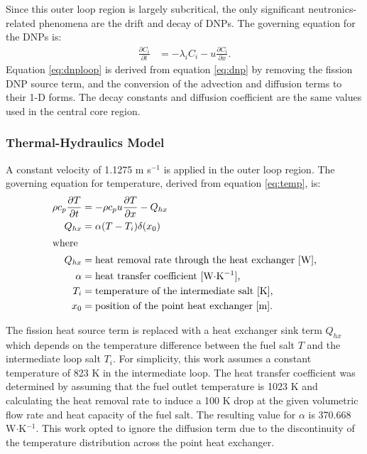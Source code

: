 Since this outer loop region is largely subcritical, the only significant
neutronics-related phenomena are the drift and decay of \glspl{DNP}.
The governing equation for the \glspl{DNP} is:
%
\begin{align}
    \frac{\partial C_i}{\partial t} &= - \lambda_i C_i - u
    \frac{\partial C_i}{\partial x}.
    \label{eq:dnploop}
\end{align}
%
Equation \ref{eq:dnploop} is derived from equation \ref{eq:dnp} by removing
the fission \gls{DNP} source term, and the conversion of the advection and
diffusion terms to their 1-D forms. The decay constants and diffusion
coefficient are the same values used in the central core region.

\subsubsection{Thermal-Hydraulics Model}

A constant velocity of 1.1275 m s$^{-1}$ is applied in the outer loop region.
The governing equation for
temperature, derived from equation \ref{eq:temp}, is:
%
\begin{align}
    \rho c_{p} \frac{\partial T}{\partial t} &= - \rho c_p u
    \frac{\partial T}{\partial x} - Q_{hx} \label{eq:temploop} \\
    Q_{hx} &= \alpha (T - T_i) \delta (x_0) \label{eq:hx} \\
    \intertext{where}
    Q_{hx} &= \text{heat removal rate through the heat exchanger [W],} 
    \nonumber \\
    \alpha &= \text{heat transfer coefficient [W$\cdot$K$^{-1}$],} \nonumber
    \\
    T_i &= \text{temperature of the intermediate salt [K],} \nonumber \\
    x_0 &= \text{position of the point heat exchanger [m].} \nonumber
\end{align}

The fission heat source term is replaced with a heat exchanger sink term
$Q_{hx}$
which depends on the temperature difference between the fuel salt $T$ and the
intermediate loop salt $T_i$. For simplicity, this work assumes a constant
temperature of 823 K in the intermediate loop. The heat transfer coefficient
was determined by assuming that the fuel outlet temperature is 1023 K and
calculating the heat removal rate to induce a 100 K drop at the given
volumetric flow rate and heat capacity of the fuel salt. The resulting value
for $\alpha$ is 370.668 W$\cdot$K$^{-1}$. This work opted to
ignore the diffusion term due to the discontinuity of the temperature
distribution across the point heat exchanger. 

